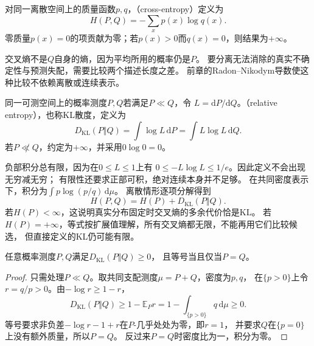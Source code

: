 \begin{definition}[离散交叉熵]
\label{def:information-cross-entropy}
对同一离散空间上的质量函数\(p,q\)，（cross-entropy）定义为
\begin{equation}
  H(P,Q)=-\sum_xp(x)\log q(x).
  \label{eq:information-cross-entropy}
\end{equation}
零质量\(p(x)=0\)的项贡献为零；若\(p(x)>0\)而\(q(x)=0\)，则结果为\(+\infty\)。
\end{definition}

交叉熵不是\(Q\)自身的熵，因为平均所用的概率仍是\(P\)。
要分离无法消除的真实不确定性与预测失配，需要比较两个描述长度之差。
前章的Radon--Nikodym导数使这种比较不依赖离散或连续表示。

\begin{definition}[相对熵]
\label{def:information-kl-divergence}
同一可测空间上的概率测度\(P,Q\)若满足\(P\ll Q\)，令
\(L=\mathrm dP/\mathrm dQ\)。（relative entropy），也称KL散度，定义为
\begin{equation}
  D_{\mathrm{KL}}(P\Vert Q)
  =\int\log L\,\mathrm dP=\int L\log L\,\mathrm dQ.
  \label{eq:information-kl-divergence}
\end{equation}
若\(P\not\ll Q\)，约定为\(+\infty\)，并采用\(0\log0=0\)。
\end{definition}

负部积分总有限，因为在\(0\leq L\leq1\)上有
\(0\leq-L\log L\leq1/e\)。因此定义不会出现无穷减无穷；
有限性还要求正部可积，绝对连续本身并不足够。
在共同密度表示下，积分为\(\int p\log(p/q)\,\mathrm d\mu\)。
离散情形逐项分解得到
\begin{equation}
  H(P,Q)=H(P)+D_{\mathrm{KL}}(P\Vert Q).
  \label{eq:information-cross-entropy-decomposition}
\end{equation}
若\(H(P)<\infty\)，这说明真实分布固定时交叉熵的多余代价恰是KL。
若\(H(P)=+\infty\)，等式按扩展值理解，所有交叉熵都无限，不能再用它们比较候选，
但直接定义的KL仍可能有限。

\begin{theorem}[Gibbs不等式]
\label{thm:information-gibbs-inequality}
任意概率测度\(P,Q\)满足\(D_{\mathrm{KL}}(P\Vert Q)\geq0\)，
且等号当且仅当\(P=Q\)。
\end{theorem}
\begin{proof}
只需处理\(P\ll Q\)。取共同支配测度\(\mu=P+Q\)，密度为\(p,q\)，
在\(\{p>0\}\)上令\(r=q/p>0\)。由\(-\log r\geq1-r\)，
\[
  D_{\mathrm{KL}}(P\Vert Q)
  \geq1-\mathbb E_Pr
  =1-\int_{\{p>0\}}q\,\mathrm d\mu\geq0.
\]
等号要求非负差\(-\log r-1+r\)在\(P\)-几乎处处为零，即\(r=1\)，
并要求\(Q\)在\(\{p=0\}\)上没有额外质量，所以\(P=Q\)。
反过来\(P=Q\)时密度比为一，积分为零。
\end{proof}

